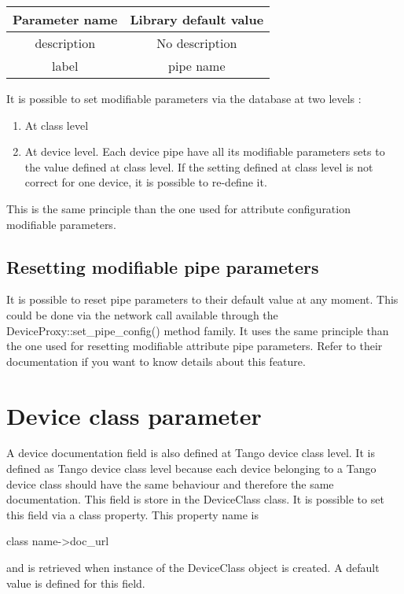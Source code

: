 \vspace{0.3cm}


\begin{center}
\begin{longtable}{|c|c|}
\hline 
Parameter name & Library default value\tabularnewline
\hline 
\hline 
description & \textquotedbl{}No description\textquotedbl{}\tabularnewline
\hline 
label & pipe name\tabularnewline
\hline 
\end{longtable}
\par\end{center}

\vspace{0.3cm}


It is possible to set modifiable parameters via the database at two
levels :
\begin{enumerate}
\item At class level
\item At device level. Each device pipe have all its modifiable parameters
sets to the value defined at class level. If the setting defined at
class level is not correct for one device, it is possible to re-define
it.
\end{enumerate}
This is the same principle than the one used for attribute configuration
modifiable parameters.


\subsection{Resetting modifiable pipe parameters}

It is possible to reset pipe parameters to their default value at
any moment. This could be done via the network call available through
the DeviceProxy::set\_pipe\_config() method family. It uses the same
principle than the one used for resetting modifiable attribute pipe
parameters. Refer to their documentation if you want to know details
about this feature.


\section{Device class parameter}

A device documentation field is also defined
at Tango device class level. It is defined as Tango device class level
because each device belonging to a Tango device class should have
the same behaviour and therefore the same documentation. This field
is store in the DeviceClass class. It is possible to set this field
via a class property. This property name is \begin{center}class name->doc\_url\end{center} and
is retrieved when instance of the DeviceClass object is created. A
default value is defined for this field.


